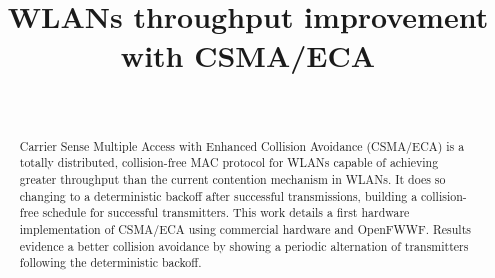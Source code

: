 \documentclass[conference]{IEEEtran}
\begin{document}
 \title{WLANs throughput improvement with CSMA/ECA}


  \author{
      \\
  }




\maketitle

\begin{abstract}
Carrier Sense Multiple Access with Enhanced Collision Avoidance (CSMA/ECA) is a totally distributed, collision-free MAC protocol for WLANs capable of achieving greater throughput than the current contention mechanism in WLANs. It does so changing to a deterministic backoff after successful transmissions, building a collision-free schedule for successful transmitters. This work details a first hardware implementation of CSMA/ECA using commercial hardware and OpenFWWF. Results evidence a better collision avoidance by showing a periodic alternation of transmitters following the deterministic backoff.

\end{abstract}
\end{document}
